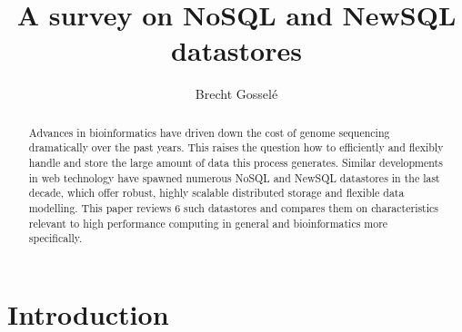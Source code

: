 \documentclass{IEEEtran}
\begin{document}
\title{A survey on NoSQL and NewSQL datastores}
\author{Brecht Gossel\'e}
\maketitle

\begin{abstract}
Advances in bioinformatics have driven down the cost of genome sequencing dramatically over the past years. This raises the question how to efficiently and flexibly handle and store the large amount of data this process generates. Similar developments in web technology have spawned numerous NoSQL and NewSQL datastores in the last decade, which offer robust, highly scalable distributed storage and flexible data modelling. This paper reviews 6 such datastores and compares them on characteristics relevant to high performance computing in general and bioinformatics more specifically. %
\end{abstract}


\section{Introduction}
\end{document}
